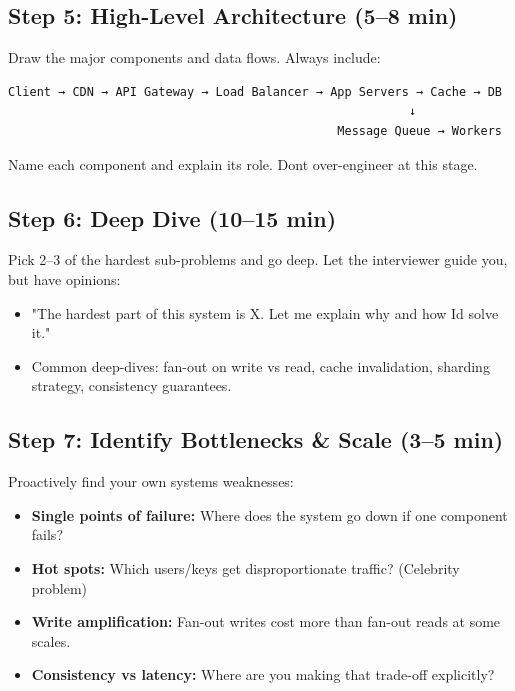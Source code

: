 \documentclass[11pt]{article}
\providecommand{\tightlist}{\setlength{\itemsep}{1pt}\setlength{\parskip}{0pt}}
\begin{document}
\subsection{Step 5: High-Level Architecture (5--8 min)}\label{step-5-high-level-architecture-58-min}

Draw the major components and data flows. Always include:

\setcodelang{}

\begin{verbatim}
Client → CDN → API Gateway → Load Balancer → App Servers → Cache → DB
                                                        ↓
                                              Message Queue → Workers
\end{verbatim}

Name each component and explain its role. Don\textquotesingle t over-engineer at this stage.

\subsection{Step 6: Deep Dive (10--15 min)}\label{step-6-deep-dive-1015-min}

Pick 2--3 of the hardest sub-problems and go deep. Let the interviewer guide you, but have opinions:

\begin{itemize}
\tightlist
\item
  "The hardest part of this system is X. Let me explain why and how I\textquotesingle d solve it."
\item
  Common deep-dives: fan-out on write vs read, cache invalidation, sharding strategy, consistency guarantees.
\end{itemize}

\subsection{Step 7: Identify Bottlenecks \& Scale (3--5 min)}\label{step-7-identify-bottlenecks--scale-35-min}

Proactively find your own system\textquotesingle s weaknesses:

\begin{itemize}
\tightlist
\item
  \textbf{Single points of failure:} Where does the system go down if one component fails?
\item
  \textbf{Hot spots:} Which users/keys get disproportionate traffic? (Celebrity problem)
\item
  \textbf{Write amplification:} Fan-out writes cost more than fan-out reads at some scales.
\item
  \textbf{Consistency vs latency:} Where are you making that trade-off explicitly?
\end{itemize}
\end{document}
